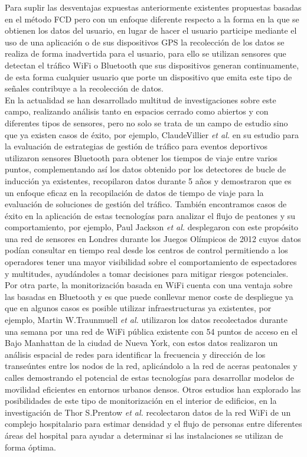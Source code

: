 \documentclass[../proyecto.tex]{subfiles}
\begin{document}
Para suplir las desventajas expuestas anteriormente existentes propuestas basadas en el método FCD pero con un enfoque diferente respecto a la forma en la que se obtienen los datos del usuario, en lugar de hacer el usuario participe mediante el uso de una aplicación o de sus dispositivos GPS la recolección de los datos se realiza de forma inadvertida para el usuario, para ello se utilizan sensores que detectan el tráfico WiFi o Bluetooth que sus dispositivos generan continuamente, de esta forma cualquier usuario que porte un dispositivo que emita este tipo de señales contribuye a la recolección de datos.\\

En la actualidad se han desarrollado multitud de investigaciones sobre este campo, realizando análisis tanto en espacios cerrado como abiertos y con diferentes tipos de sensores, pero no solo se trata de un campo de estudio sino que ya existen casos de éxito, por ejemplo, ClaudeVillier \textit{et al.} en su estudio para la evaluación de estrategias de gestión de tráfico para eventos deportivos \cite{VILLIERS2019100052} utilizaron sensores Bluetooth para obtener los tiempos de viaje entre varios puntos, complementando así los datos obtenido por los detectores de bucle de inducción ya existentes, recopilaron datos durante 5 años y demostraron que es un enfoque eficaz en la recopilación de datos de tiempo de viaje para la evaluación de soluciones de gestión del tráfico. También encontramos casos de éxito en la aplicación de estas tecnologías para analizar el flujo de peatones y su comportamiento, por ejemplo,  Paul Jackson \textit{et al.} \cite{JACKSON2012} desplegaron con este propósito una red de sensores en Londres durante los Juegos Olímpicos de 2012 cuyos datos podían consultar en tiempo real desde los centros de control permitiendo a los operadores tener una mayor visibilidad sobre el comportamiento de espectadores y multitudes, ayudándoles a tomar decisiones para mitigar riesgos potenciales. \\

Por otra parte, la monitorización basada en WiFi cuenta con una ventaja sobre las basadas en Bluetooth y es que puede conllevar menor coste de despliegue ya que en algunos casos es posible utilizar infraestructuras ya existentes, por ejemplo, Martin W.Traunmuell \textit{et al.} \cite{TRAUNMUELLER20184} utilizaron los datos recolectados durante una semana por una red de WiFi pública existente con 54 puntos de acceso en el Bajo Manhattan de la ciudad de Nueva York, con estos datos realizaron un análisis espacial de redes para identificar la frecuencia y dirección de los transeúntes entre los nodos de la red, aplicándolo a la red de aceras peatonales y calles  demostrando el potencial de estas tecnologías para desarrollar modelos de movilidad eficientes en entornos urbanos densos. Otros estudios han explorado las posibilidades de este tipo de monitorización en el interior de edificios, en la investigación de Thor S.Prentow \textit{et al.} \cite{PRENTOW2015305} recolectaron datos de la red WiFi de un complejo hospitalario para estimar densidad y el flujo de personas entre diferentes áreas del hospital para ayudar a determinar si las instalaciones se utilizan de forma óptima.\\
\end{document}
